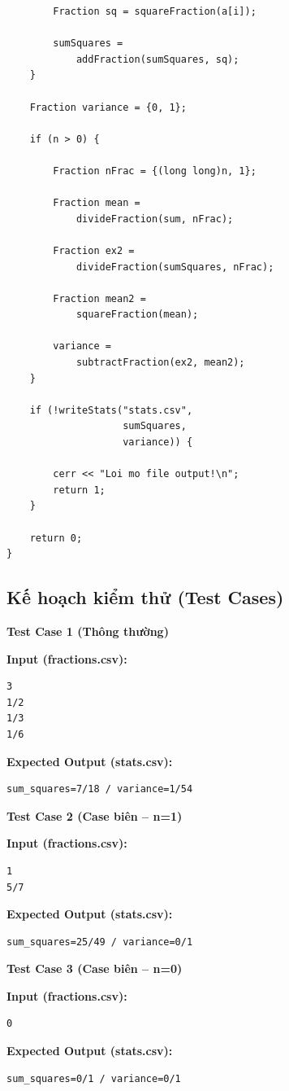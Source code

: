 \begin{lstlisting}
        Fraction sq = squareFraction(a[i]);

        sumSquares =
            addFraction(sumSquares, sq);
    }

    Fraction variance = {0, 1};

    if (n > 0) {

        Fraction nFrac = {(long long)n, 1};

        Fraction mean =
            divideFraction(sum, nFrac);

        Fraction ex2 =
            divideFraction(sumSquares, nFrac);

        Fraction mean2 =
            squareFraction(mean);

        variance =
            subtractFraction(ex2, mean2);
    }

    if (!writeStats("stats.csv",
                    sumSquares,
                    variance)) {

        cerr << "Loi mo file output!\n";
        return 1;
    }

    return 0;
}
\end{lstlisting}

\subsection{Kế hoạch kiểm thử (Test Cases)}

\textbf{Test Case 1 (Thông thường)}

\textbf{Input (fractions.csv):}

\begin{lstlisting}
3
1/2
1/3
1/6
\end{lstlisting}

\textbf{Expected Output (stats.csv):}

\begin{lstlisting}
sum_squares=7/18 / variance=1/54
\end{lstlisting}

\vspace{0.5cm}

\textbf{Test Case 2 (Case biên -- n=1)}

\textbf{Input (fractions.csv):}

\begin{lstlisting}
1
5/7
\end{lstlisting}

\textbf{Expected Output (stats.csv):}

\begin{lstlisting}
sum_squares=25/49 / variance=0/1
\end{lstlisting}

\vspace{0.5cm}

\textbf{Test Case 3 (Case biên -- n=0)}

\textbf{Input (fractions.csv):}

\begin{lstlisting}
0
\end{lstlisting}

\textbf{Expected Output (stats.csv):}

\begin{lstlisting}
sum_squares=0/1 / variance=0/1
\end{lstlisting}